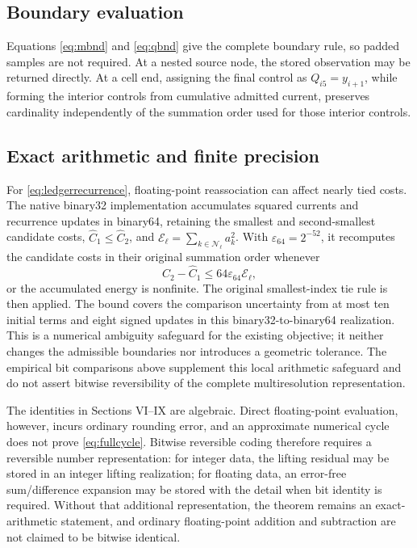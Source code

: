 \documentclass[journal]{IEEEtran}
\begin{document}
\subsection{Boundary evaluation}

Equations \eqref{eq:mbnd} and \eqref{eq:qbnd} give the complete boundary
rule, so padded samples are not required. At a nested source node, the stored
observation may be returned directly. At a cell end, assigning the final
control as \(Q_{i5}=y_{i+1}\), while forming the interior controls from
cumulative admitted current, preserves cardinality independently of the
summation order used for those interior controls.

\subsection{Exact arithmetic and finite precision}

For \eqref{eq:ledgerrecurrence}, floating-point reassociation can affect
nearly tied costs. The native binary32 implementation accumulates squared
currents and recurrence updates in binary64, retaining the smallest and
second-smallest candidate costs, \(\widehat C_1\leq\widehat C_2\), and
\(\mathcal E_\ell=\sum_{k\in\mathcal N_\ell}a_k^2\). With
\(\varepsilon_{64}=2^{-52}\), it recomputes the candidate costs in their
original summation order whenever
\begin{equation}
 \widehat C_2-\widehat C_1
 \leq64\varepsilon_{64}\mathcal E_\ell,
 \label{eq:ledgertieguard}
\end{equation}
or the accumulated energy is nonfinite. The original smallest-index tie
rule is then applied. The bound covers the comparison uncertainty from
at most ten initial terms and eight signed updates in this binary32-to-binary64
realization. This is a numerical ambiguity safeguard for the existing
objective; it neither changes the admissible boundaries nor introduces a
geometric tolerance. The empirical bit comparisons above supplement this
local arithmetic safeguard and do not assert bitwise reversibility of the
complete multiresolution representation.


The identities in Sections VI--IX are algebraic. Direct floating-point
evaluation, however, incurs ordinary rounding error, and an approximate
numerical cycle does not prove \eqref{eq:fullcycle}. Bitwise reversible coding
therefore requires a reversible number representation: for integer data, the
lifting residual may be stored in an integer lifting realization; for
floating data, an error-free sum/difference expansion may be stored with the
detail when bit identity is required. Without that additional representation,
the theorem remains an exact-arithmetic statement, and ordinary
floating-point addition and subtraction are not claimed to be bitwise
identical.
\end{document}
